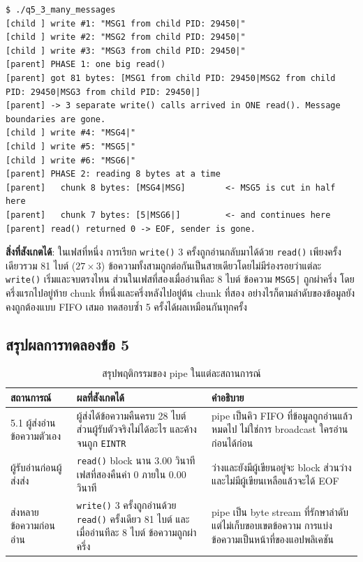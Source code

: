 \documentclass[a4paper,12pt]{article}
\newcommand{\code}[1]{\texttt{#1}}
\begin{document}
\begin{lstlisting}[style=terminal,caption={ผลลัพธ์ของข้อ 5.3}]
$ ./q5_3_many_messages
[child ] write #1: "MSG1 from child PID: 29450|"
[child ] write #2: "MSG2 from child PID: 29450|"
[child ] write #3: "MSG3 from child PID: 29450|"
[parent] PHASE 1: one big read()
[parent] got 81 bytes: [MSG1 from child PID: 29450|MSG2 from child PID: 29450|MSG3 from child PID: 29450|]
[parent] -> 3 separate write() calls arrived in ONE read(). Message boundaries are gone.
[child ] write #4: "MSG4|"
[child ] write #5: "MSG5|"
[child ] write #6: "MSG6|"
[parent] PHASE 2: reading 8 bytes at a time
[parent]   chunk 8 bytes: [MSG4|MSG]        <- MSG5 is cut in half here
[parent]   chunk 7 bytes: [5|MSG6|]         <- and continues here
[parent] read() returned 0 -> EOF, sender is gone.
\end{lstlisting}

\textbf{สิ่งที่สังเกตได้}: ในเฟสที่หนึ่ง การเรียก \code{write()} 3 ครั้งถูกอ่านกลับมาได้ด้วย \code{read()} เพียงครั้งเดียวรวม 81 ไบต์ ($27 \times 3$) ข้อความทั้งสามถูกต่อกันเป็นสายเดียวโดยไม่มีร่องรอยว่าแต่ละ \code{write()} เริ่มและจบตรงไหน ส่วนในเฟสที่สองเมื่ออ่านทีละ 8 ไบต์ ข้อความ \code{MSG5|} ถูกผ่าครึ่ง โดยครึ่งแรกไปอยู่ท้าย chunk ที่หนึ่งและครึ่งหลังไปอยู่ต้น chunk ที่สอง อย่างไรก็ตามลำดับของข้อมูลยังคงถูกต้องแบบ FIFO เสมอ ทดสอบซ้ำ 5 ครั้งได้ผลเหมือนกันทุกครั้ง

\newpage

\subsection{สรุปผลการทดลองข้อ 5}

\begin{table}[H]
\centering
\caption{สรุปพฤติกรรมของ pipe ในแต่ละสถานการณ์}
\begin{tabular}{p{3.6cm}p{4.6cm}p{5.4cm}}
\toprule
\textbf{สถานการณ์} & \textbf{ผลที่สังเกตได้} & \textbf{คำอธิบาย} \\
\midrule
5.1 ผู้ส่งอ่านข้อความตัวเอง
  & ผู้ส่งได้ข้อความคืนครบ 28 ไบต์ ส่วนผู้รับตัวจริงไม่ได้อะไร และค้างจนถูก \code{EINTR}
  & pipe เป็นคิว FIFO ที่ข้อมูลถูกอ่านแล้วหมดไป ไม่ใช่การ broadcast ใครอ่านก่อนได้ก่อน \\
\addlinespace
5.2 ผู้รับอ่านก่อนผู้ส่งส่ง
  & \code{read()} block นาน 3.00 วินาที เฟสที่สองคืนค่า 0 ภายใน 0.00 วินาที
  & ว่างและยังมีผู้เขียนอยู่จะ block ส่วนว่างและไม่มีผู้เขียนเหลือแล้วจะได้ EOF \\
\addlinespace
5.3 ส่งหลายข้อความก่อนอ่าน
  & \code{write()} 3 ครั้งถูกอ่านด้วย \code{read()} ครั้งเดียว 81 ไบต์ และเมื่ออ่านทีละ 8 ไบต์ ข้อความถูกผ่าครึ่ง
  & pipe เป็น byte stream ที่รักษาลำดับแต่ไม่เก็บขอบเขตข้อความ การแบ่งข้อความเป็นหน้าที่ของแอปพลิเคชัน \\
\bottomrule
\end{tabular}
\end{table}
\end{document}
